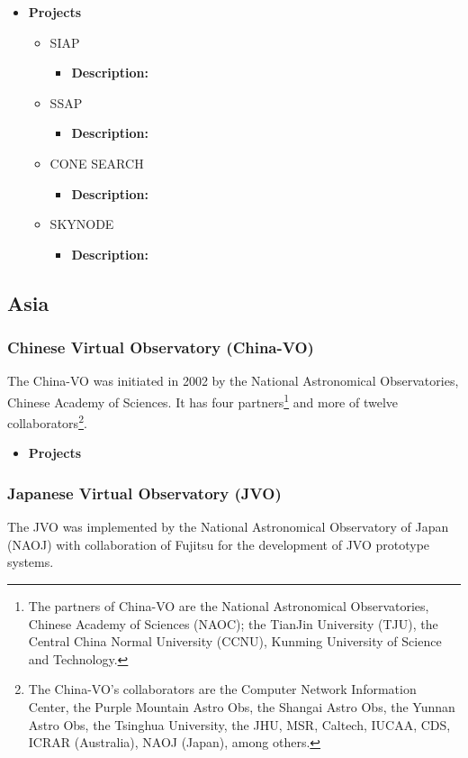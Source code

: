 \begin{itemize}
\item \textbf{Projects}
\begin{itemize}
\item SIAP
\begin{itemize}
\item \textbf{Description:} 
\end{itemize}
\item SSAP
\begin{itemize}
\item \textbf{Description:} 
\end{itemize}
\item CONE SEARCH
\begin{itemize}
\item \textbf{Description:} 
\end{itemize}
\item SKYNODE
\begin{itemize}
\item \textbf{Description:} 
\end{itemize}
\end{itemize}
\end{itemize}

\subsection{Asia}
\subsubsection{Chinese Virtual Observatory (China-VO)}
The China-VO was initiated in 2002 by the National Astronomical Observatories,
Chinese Academy of Sciences. It has four partners\footnote{The partners of
China-VO are the National Astronomical Observatories, Chinese Academy of
Sciences (NAOC); the TianJin University (TJU), the Central China Normal
University (CCNU), Kunming University of Science and Technology.} and more of
twelve collaborators\footnote{The China-VO's collaborators are the Computer
Network Information Center, the Purple Mountain Astro Obs, the Shangai Astro
Obs, the Yunnan Astro Obs, the Tsinghua University, the JHU, MSR, Caltech,
IUCAA, CDS, ICRAR (Australia), NAOJ (Japan), among others.}.

\begin{itemize}
\item \textbf{Projects}
\end{itemize}

\subsubsection{Japanese Virtual Observatory (JVO)}
The JVO was implemented by the National Astronomical Observatory of Japan (NAOJ)
with collaboration of Fujitsu for the development of JVO prototype systems.


